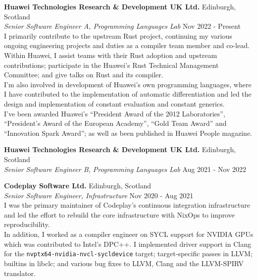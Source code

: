 \documentclass[a4paper]{article}
\begin{document}
\textbf{Huawei Technologies Research \& Development UK Ltd.} \hfill {\color{gray} Edinburgh, Scotland} \\
\textit{Senior Software Engineer A, Programming Languages Lab} \hfill {\color{gray} Nov 2022 - Present} \\
\vspace{2mm}
I primarily contribute to the upstream Rust project, continuing my various ongoing engineering
projects and duties as a compiler team member and co-lead. Within Huawei, I assist teams with their
Rust adoption and upstream contributions; participate in the Huawei's Rust Technical Management
Committee; and give talks on Rust and its compiler. \\
\vspace{2mm}
I'm also involved in development of Huawei's own programming languages, where I have contributed
to the implementation of automatic differentiation and led the design and implementation of constant
evaluation and constant generics. \\
\vspace{2mm}
I've been awarded Huawei's ``President Award of the 2012 Laboratories'', ``President's Award of the
European Academy'', ``Gold Team Award'' and ``Innovation Spark Award''; as well as been published
in Huawei People magazine.
\vspace{2mm}

\textbf{Huawei Technologies Research \& Development UK Ltd.} \hfill {\color{gray} Edinburgh, Scotland} \\
\textit{Senior Software Engineer B, Programming Languages Lab} \hfill {\color{gray} Aug 2021 - Nov 2022} \\
\vspace{2mm}

\textbf{Codeplay Software Ltd.} \hfill {\color{gray} Edinburgh, Scotland} \\
\textit{Senior Software Engineer, Infrastructure} \hfill {\color{gray} Nov 2020 - Aug 2021} \\
\vspace{2mm}
I was the primary maintainer of Codeplay's continuous integration infrastructure and led the effort
to rebuild the core infrastructure with NixOps to improve reproducibility. \\
\vspace{2mm}
In addition, I worked as a compiler engineer on SYCL support for NVIDIA GPUs which was contributed
to Intel's DPC++. I implemented driver support in Clang for the
\verb|nvptx64-nvidia-nvcl-sycldevice| target; target-specific passes in LLVM; builtins in libclc;
and various bug fixes to LLVM, Clang and the LLVM-SPIRV translator.
\vspace{2mm}
\end{document}
